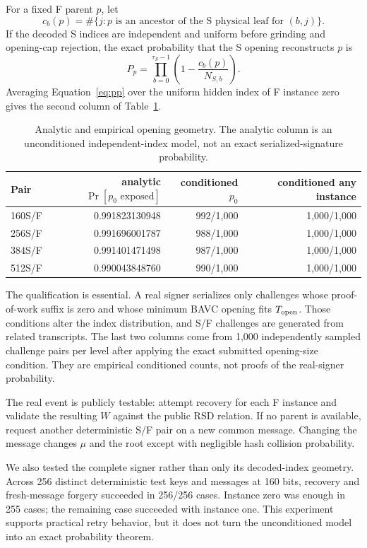 \documentclass[11pt,a4paper]{article}
\begin{document}
For a fixed F parent $p$, let
\[
 c_b(p)=\#\{j:p\text{ is an ancestor of the S physical leaf for }(b,j)\}.
\]
If the decoded S indices are independent and uniform before grinding and
opening-cap rejection, the exact probability that the S opening reconstructs
$p$ is
\begin{equation}
 P_p=\prod_{b=0}^{\tau_S-1}
       \left(1-\frac{c_b(p)}{N_{S,b}}\right).                 \label{eq:pp}
\end{equation}
Averaging Equation~\eqref{eq:pp} over the uniform hidden index of F instance
zero gives the second column of Table~\ref{tab:prob}.

\begin{table}[ht]
\centering
\caption{Analytic and empirical opening geometry.  The analytic column is an
unconditioned independent-index model, not an exact serialized-signature
probability.}
\label{tab:prob}
\begin{tabular}{lrrr}
\toprule
Pair & analytic $\Pr[p_0\text{ exposed}]$
     & conditioned $p_0$ & conditioned any instance\\
\midrule
160S/F & 0.991823130948 & 992/1,000 & 1,000/1,000\\
256S/F & 0.991696001787 & 988/1,000 & 1,000/1,000\\
384S/F & 0.991401471498 & 987/1,000 & 1,000/1,000\\
512S/F & 0.990043848760 & 990/1,000 & 1,000/1,000\\
\bottomrule
\end{tabular}
\end{table}

The qualification is essential.  A real signer serializes only challenges
whose proof-of-work suffix is zero and whose minimum BAVC opening fits
$T_{\rm open}$.  Those conditions alter the index distribution, and S/F
challenges are generated from related transcripts.  The last two columns come
from 1,000 independently sampled challenge pairs per level after applying the
exact submitted opening-size condition.  They are empirical conditioned counts,
not proofs of the real-signer probability.

The real event is publicly testable: attempt recovery for each F instance and
validate the resulting $W$ against the public RSD relation.  If no parent is
available, request another deterministic S/F pair on a new common message.
Changing the message changes $\mu$ and the root except with negligible hash
collision probability.

We also tested the complete signer rather than only its decoded-index geometry.
Across 256 distinct deterministic test keys and messages at 160 bits, recovery
and fresh-message forgery succeeded in 256/256 cases.  Instance zero was enough
in 255 cases; the remaining case succeeded with instance one.  This experiment
supports practical retry behavior, but it does not turn the unconditioned model
into an exact probability theorem.
\end{document}
